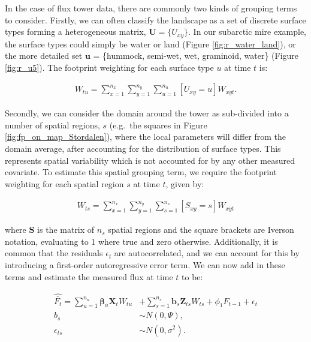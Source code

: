In the case of flux tower data, there are commonly two kinds of grouping
terms to consider. Firstly, we can often classify the landscape as a set
of discrete surface types forming a heterogeneous matrix,
\(\mathbf{U} = \{U_{xy}\}\). In our subarctic mire example, the surface
types could simply be water or land (Figure \ref{fig:r_water_land}), or
the more detailed set \(\mathbf{u}\) = \{hummock, semi-wet, wet,
graminoid, water\} (Figure \ref{fig:r_u5}). The footprint weighting for
each surface type \(u\) at time \(t\) is:

\begin{align}   \label{eq:uWtMean}
  W_{tu} = \sum_{x = 1}^{n_x} \sum_{y = 1}^{n_y}  \sum_{u = 1}^{n_u} [U_{xy} = u] W_{xyt}.
\end{align}

Secondly, we can consider the domain around the tower as sub-divided
into a number of spatial regions, \(s\) (e.g.~the squares in Figure
\ref{fig:fp_on_map_Stordalen}), where the local parameters will differ
from the domain average, after accounting for the distribution of
surface types. This represents spatial variability which is not
accounted for by any other measured covariate. To estimate this spatial grouping
term, we require the footprint weighting for each spatial region \(s\)
at time \(t\), given by:

\begin{align}   \label{eq:sWtMean}
  W_{ts} = \sum_{x = 1}^{n_x} \sum_{y = 1}^{n_y}  \sum_{s = 1}^{n_s} [S_{xy} = s] W_{xyt}
\end{align}

where \(\mathbf{S}\) is the matrix of \(n_s\) spatial regions and the
square brackets are Iverson notation, evaluating to 1 where true and
zero otherwise. Additionally, it is common that the residuals
\(\epsilon_{t}\) are autocorrelated, and we can account for this by
introducing a first-order autoregressive error term. We can now add in
these terms and estimate the measured flux at time \(t\) to be:

\begin{align}   \label{eq:pred_Fbarhat}
  \widehat{\bar{F_t}} = \sum_{u = 1}^{n_u} \boldsymbol{\beta}_u \mathbf{X}_t W_{tu} 
                       &+ \sum_{s = 1}^{n_s} \mathbf{b}_s \mathbf{Z}_{ts} W_{ts} 
                       + \phi_{1}F_{t-1} + \epsilon_{t} \\
  b_s & \sim N(0, \Psi), \\
  \epsilon_{ts} & \sim N(0, \sigma^2).
\end{align}

